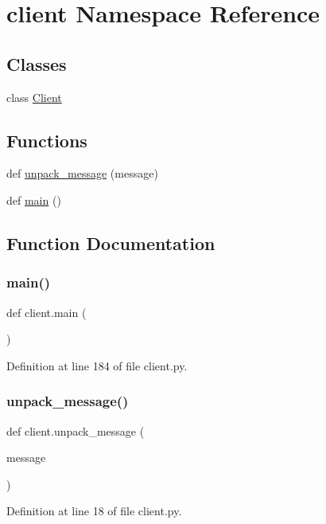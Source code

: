 \hypertarget{namespaceclient}{}\section{client Namespace Reference}
\label{namespaceclient}
\subsection*{Classes}
\begin{DoxyCompactItemize}
\item 
class \mbox{\hyperlink{classclient_1_1_client}{Client}}
\end{DoxyCompactItemize}
\subsection*{Functions}
\begin{DoxyCompactItemize}
\item 
def \mbox{\hyperlink{namespaceclient_a7dcf7c4388de9af30cfb1429438f639f}{unpack\+\_\+message}} (message)
\item 
def \mbox{\hyperlink{namespaceclient_a18d2f0bd3df369370bdb40b86fe2892b}{main}} ()
\end{DoxyCompactItemize}


\subsection{Function Documentation}
\mbox{\label{namespaceclient_a18d2f0bd3df369370bdb40b86fe2892b}} 
\subsubsection{\texorpdfstring{main()}{main()}}
{\footnotesize\ttfamily def client.\+main (\begin{DoxyParamCaption}{ }\end{DoxyParamCaption})}



Definition at line 184 of file client.\+py.

\mbox{\label{namespaceclient_a7dcf7c4388de9af30cfb1429438f639f}} 
\subsubsection{\texorpdfstring{unpack\_message()}{unpack\_message()}}
{\footnotesize\ttfamily def client.\+unpack\+\_\+message (\begin{DoxyParamCaption}\item[{}]{message }\end{DoxyParamCaption})}



Definition at line 18 of file client.\+py.

